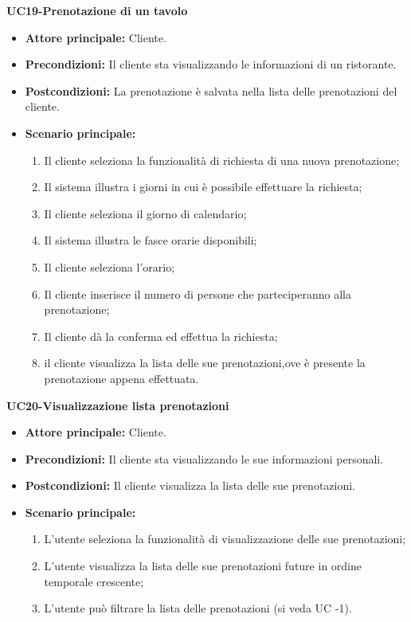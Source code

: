 \textbf{UC19-Prenotazione di un tavolo}
\begin{itemize}
    \item \textbf{Attore principale: }Cliente.
    \item \textbf{Precondizioni: }Il cliente sta visualizzando le informazioni di un ristorante.
    \item \textbf{Postcondizioni: }La prenotazione è salvata nella lista delle prenotazioni del cliente.
    \item \textbf{Scenario principale:} 
        \begin{enumerate}
            \item Il cliente seleziona la funzionalità di richiesta di una nuova prenotazione;
            \item Il sistema illustra i giorni in cui è possibile effettuare la richiesta;
            \item Il cliente seleziona il giorno di calendario;
            \item Il sistema illustra le fasce orarie disponibili;
            \item Il cliente seleziona l'orario;
            \item Il cliente inserisce il numero di persone che parteciperanno alla prenotazione;
            \item Il cliente dà la conferma ed effettua la richiesta;
            \item il cliente visualizza la lista delle sue prenotazioni,ove è presente la prenotazione appena
            effettuata.
        \end{enumerate}
\end{itemize}

\textbf{UC20-Visualizzazione lista prenotazioni}
\begin{itemize}
    \item \textbf{Attore principale: } Cliente.
    \item \textbf{Precondizioni: }Il cliente sta visualizzando le sue informazioni personali.
    \item \textbf{Postcondizioni: }Il cliente visualizza la lista delle sue prenotazioni.
    \item \textbf{Scenario principale:} 
        \begin{enumerate}
            \item L'utente seleziona la funzionalità di visualizzazione delle sue prenotazioni;
            \item L'utente visualizza la lista delle sue prenotazioni future in ordine temporale crescente;
            \item L'utente può filtrare la lista delle prenotazioni (si veda UC -1).
        \end{enumerate}
\end{itemize}

